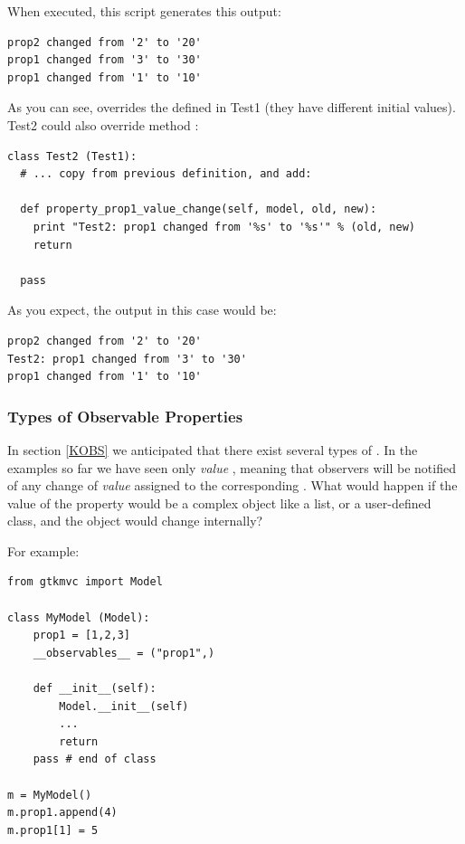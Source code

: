 When executed, this script generates this output:
{ \codesize 
\begin{verbatim} 
prop2 changed from '2' to '20'
prop1 changed from '3' to '30'
prop1 changed from '1' to '10'
\end{verbatim}
}

As you can see,  overrides the \OP {}
defined in Test1 (they have different initial values).  Test2 could
also override method :

{ \codesize 
\begin{verbatim} 
class Test2 (Test1):
  # ... copy from previous definition, and add:
   
  def property_prop1_value_change(self, model, old, new):
    print "Test2: prop1 changed from '%s' to '%s'" % (old, new)
    return   

  pass
\end{verbatim}
}

As you expect, the output in this case would be:
{ \codesize 
\begin{verbatim} 
prop2 changed from '2' to '20'
Test2: prop1 changed from '3' to '30'
prop1 changed from '1' to '10'
\end{verbatim}
}


\subsubsection{\label{KOBS:DET}Types of Observable Properties}

In section \ref{KOBS} we anticipated that there exist several types
of \OP. In the examples so far we have seen only \emph{value} \OPS,
meaning that observers will be notified of any change of \emph{value}
assigned to the corresponding \OP. What would happen if the value of
the property would be a complex object like a list, or a user-defined
class, and the object would change internally?

For example:

{ \codesize 
\begin{verbatim} 
from gtkmvc import Model

class MyModel (Model):
    prop1 = [1,2,3]
    __observables__ = ("prop1",)

    def __init__(self):
        Model.__init__(self)
        ...
        return
    pass # end of class

m = MyModel()
m.prop1.append(4)
m.prop1[1] = 5
\end{verbatim}
}


